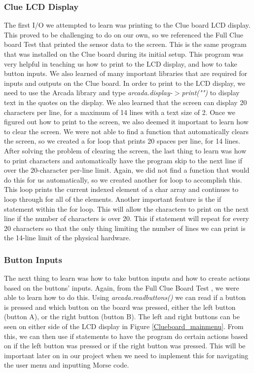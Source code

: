 \documentclass[12pt]{article}
\begin{document}
\subsubsection{Clue LCD Display}
The first I/O we attempted to learn was printing to the Clue board LCD display. This proved to be challenging to do on our own, so we referenced the Full Clue board Test \cite{ClueBoardTest} that printed the sensor data to the screen. This is the same program that was installed on the Clue board during its initial setup. This program was very helpful in teaching us how to print to the LCD display, and how to take button inputs. We also learned of many important libraries that are required for inputs and outputs on the Clue board. In order to print to the LCD display, we need to use the Arcada library and type \emph{arcada.display-$>$print("")} to display text in the quotes on the display. We also learned that the screen can display 20 characters per line, for a maximum of 14 lines with a text size of 2. Once we figured out how to print to the screen, we also deemed it important to learn how to clear the screen. We were not able to find a function that automatically clears the screen, so we created a for loop that prints 20 spaces per line, for 14 lines. After solving the problem of clearing the screen, the last thing to learn was how to print characters and automatically have the program skip to the next line if over the 20-character per-line limit. Again, we did not find a function that would do this for us automatically, so we created another for loop to accomplish this. This loop prints the current indexed element of a char array and continues to loop through for all of the elements. Another important feature is the if statement within the for loop. This will allow the characters to print on the next line if the number of characters is over 20. This if statement will repeat for every 20 characters so that the only thing limiting the number of lines we can print is the 14-line limit of the physical hardware. 
\subsubsection{Button Inputs}
The next thing to learn was how to take button inputs and how to create actions based on the buttons' inputs. Again, from the Full Clue Board Test \cite{ClueBoardTest}, we were able to learn how to do this. Using \emph{arcada.readbuttons()} we can read if a button is pressed and which button on the board was pressed, either the left button (button A), or the right button (button B). The left and right buttons can be seen on either side of the LCD display in Figure \ref{Clueboard_mainmenu}. From this, we can then use if statements to have the program do certain actions based on if the left button was pressed or if the right button was pressed. This will be important later on in our project when we need to implement this for navigating the user menu and inputting Morse code. 
\end{document}
